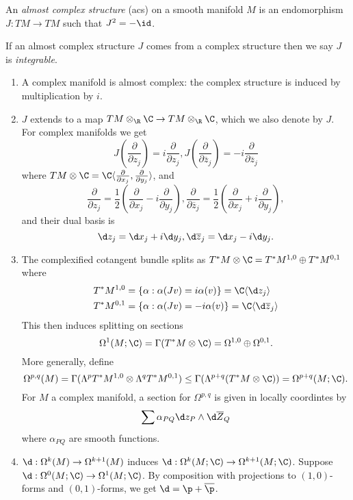 \documentclass[a4paper]{article}
\newcommand{\w}{\wedge} %
\begin{document}
\begin{definition}
  An \emph{almost complex structure} (acs) on a smooth manifold \(M\) is an endomorphism \(J: TM \to TM\) such that \(J^2 = -\id\).
\end{definition}

\begin{definition}[integrable]
  If an almost complex structure \(J\) comes from a complex structure then we say \(J\) is \emph{integrable}.
\end{definition}

\begin{remark}\leavevmode
  \begin{enumerate}
  \item A complex manifold is almost complex: the complex structure is induced by multiplication by \(i\).
  \item \(J\) extends to a map \(TM \otimes_\R \C \to TM \otimes_\R \C\), which we also denote by \(J\). For complex manifolds we get
    \[
      J(\frac{\partial  }{\partial z_j}) = i \frac{\partial  }{\partial z_j}, J(\frac{\partial  }{\partial \overline z_j}) = -i \frac{\partial  }{\partial \overline z_j}
    \]
    where \(TM \otimes \C = \C \langle \frac{\partial  }{\partial x_j}, \frac{\partial  }{\partial y_j} \rangle\), and
    \[
      \frac{\partial  }{\partial z_j} = \frac{1}{2}(\frac{\partial  }{\partial x_j} - i \frac{\partial  }{\partial y_j}),
      \frac{\partial  }{\partial \overline z_j} = \frac{1}{2}(\frac{\partial  }{\partial x_j} + i \frac{\partial  }{\partial y_j}),
    \]
    and their dual basis is
    \[
      \d z_j = \d x_j + i \d y_j, \d \overline z_j = \d x_j - i \d y_j.
    \]
  \item The complexified cotangent bundle splits as \(T^*M \otimes \C = T^*M^{1, 0} \oplus T^*M^{0, 1}\) where
    \begin{align*}
      T^*M^{1, 0} &= \{\alpha: \alpha(Jv) = i \alpha(v)\} = \C \langle \d z_j \rangle \\
      T^*M^{0, 1} &= \{\alpha: \alpha(Jv) = -i \alpha(v)\} = \C \langle \d \overline z_j \rangle \\
    \end{align*}
    This then induces splitting on sections
    \[
      \Omega^1(M; \C) = \Gamma(T^*M \otimes \C) = \Omega^{1, 0} \oplus \Omega^{0, 1}.
    \]
    More generally, define
    \[
      \Omega^{p, q}(M) = \Gamma(\Lambda^pT^*M^{1, 0} \otimes \Lambda^qT^*M^{0, 1}) \leq \Gamma(\Lambda^{p + q}(T^*M \otimes \C)) = \Omega^{p + q}(M; \C).
    \]
    For \(M\) a complex manifold, a section for \(\Omega^{p, q}\) is given in locally coordintes by
    \[
      \sum \alpha_{PQ} \d z_P \w \d \overline Z_Q
    \]
    where \(\alpha_{PQ}\) are smooth functions.
  \item \(\d: \Omega^k(M) \to \Omega^{k + 1}(M)\) induces \(\d: \Omega^k(M; \C) \to \Omega^{k + 1}(M; \C)\). Suppose \(\d: \Omega^0(M; \C) \to \Omega^1(M; \C)\). By composition with projections to \((1, 0)\)-forms and \((0, 1)\)-forms, we get \(\d = \p + \overline \p\).


\end{enumerate}
\end{remark}
\end{document}
